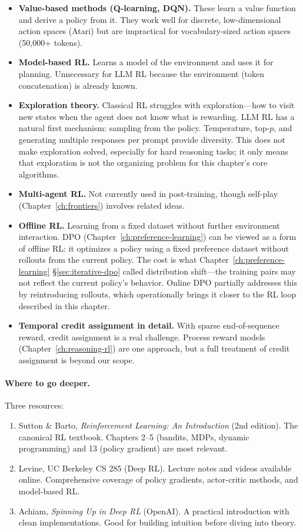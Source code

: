 \begin{itemize}[nosep]
  \item \textbf{Value-based methods (Q-learning, DQN).} These learn a value function and derive a policy from it. They work well for discrete, low-dimensional action spaces (Atari) but are impractical for vocabulary-sized action spaces (50{,}000+ tokens).
  \item \textbf{Model-based RL.} Learns a model of the environment and uses it for planning. Unnecessary for LLM RL because the environment (token concatenation) is already known.
  \item \textbf{Exploration theory.} Classical RL struggles with exploration---how to visit new states when the agent does not know what is rewarding. LLM RL has a natural first mechanism: sampling from the policy. Temperature, top-$p$, and generating multiple responses per prompt provide diversity. This does not make exploration solved, especially for hard reasoning tasks; it only means that exploration is not the organizing problem for this chapter's core algorithms.
  \item \textbf{Multi-agent RL.} Not currently used in post-training, though self-play (Chapter~\ref{ch:frontiers}) involves related ideas.
  \item \textbf{Offline RL.} Learning from a fixed dataset without further environment interaction. DPO (Chapter~\ref{ch:preference-learning}) can be viewed as a form of offline RL: it optimizes a policy using a fixed preference dataset without rollouts from the current policy. The cost is what Chapter~\ref{ch:preference-learning} \S\ref{sec:iterative-dpo} called distribution shift---the training pairs may not reflect the current policy's behavior. Online DPO partially addresses this by reintroducing rollouts, which operationally brings it closer to the RL loop described in this chapter.
  \item \textbf{Temporal credit assignment in detail.} With sparse end-of-sequence reward, credit assignment is a real challenge. Process reward models (Chapter~\ref{ch:reasoning-rl}) are one approach, but a full treatment of credit assignment is beyond our scope.
\end{itemize}

\paragraph{Where to go deeper.} Three resources:

\begin{enumerate}[nosep]
  \item Sutton \& Barto, \emph{Reinforcement Learning: An Introduction} (2nd edition). The canonical RL textbook. Chapters 2--5 (bandits, MDPs, dynamic programming) and 13 (policy gradient) are most relevant.
  \item Levine, UC Berkeley CS 285 (Deep RL). Lecture notes and videos available online. Comprehensive coverage of policy gradients, actor-critic methods, and model-based RL.
  \item Achiam, \emph{Spinning Up in Deep RL} (OpenAI). A practical introduction with clean implementations. Good for building intuition before diving into theory.
\end{enumerate}

